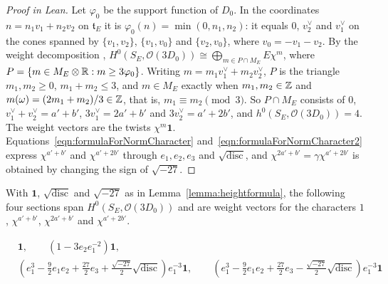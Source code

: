 \begin{proof}[Proof in Lean]

\leanok


Let $\varphi_0$ be the support function of $D_0$. In the coordinates $n=n_1v_1+n_2v_2$ on $\mathfrak t_E$ it is $\varphi_0(n)=\min(0,n_1,n_2)$: it equals $0$, $v_2^\vee$ and $v_1^\vee$ on the cones spanned by $\{v_1,v_2\}$, $\{v_1,v_0\}$ and $\{v_2,v_0\}$, where $v_0=-v_1-v_2$. By the weight decomposition \cite[\S3.4, p.~66]{MR1234037}, $H^0(S_E,\mathcal O(3D_0))\cong\bigoplus_{m\in P\cap M_E}E\chi^m$, where $P=\{m\in M_E\otimes\mathbb{R}: m\geq3\varphi_0\}$. Writing $m=m_1v_1^\vee+m_2v_2^\vee$, $P$ is the triangle $m_1,m_2\geq0$, $m_1+m_2\leq3$, and $m\in M_E$ exactly when $m_1,m_2\in\mathbb{Z}$ and $m(\omega)=(2m_1+m_2)/3\in\mathbb{Z}$, that is, $m_1\equiv m_2\pmod 3$. So $P\cap M_E$ consists of $0$, $v_1^\vee+v_2^\vee=a'+b'$, $3v_1^\vee=2a'+b'$ and $3v_2^\vee=a'+2b'$, and $h^0(S_E,\mathcal O(3D_0))=4$. The weight vectors are the twists $\chi^m\mathbf 1$. Equations~\ref{eqn:formulaForNormCharacter} and~\ref{eqn:formulaForNormCharacter2} express $\chi^{a'+b'}$ and $\chi^{a'+2b'}$ through $e_1,e_2,e_3$ and $\sqrt{\mathrm{disc}}$, and $\chi^{2a'+b'}=\gamma\chi^{a'+2b'}$ is obtained by changing the sign of $\sqrt{-27}$.

\end{proof}

\begin{equationnode}

\label{eqn:weightVectors}


\leanok

With $\mathbf 1$, $\sqrt{\mathrm{disc}}$ and $\sqrt{-27}$ as in Lemma~\ref{lemma:heightformula}, the following four sections span $H^0(S_E,\mathcal O(3D_0))$ and are weight vectors for the characters $1$, $\chi^{a'+b'}$, $\chi^{2a'+b'}$ and $\chi^{a'+2b'}$.

\begin{align*} &\mathbf 1,\qquad (1-3e_2e_1^{-2})\mathbf 1, \\ &(e_1^3-\tfrac 92 e_1 e_2+ \tfrac{27}{2} e_3 + \tfrac{\sqrt{-27}}{2} \sqrt{\mathrm{disc}}) e_1^{-3}\mathbf 1,\qquad (e_1^3-\tfrac 92 e_1 e_2+ \tfrac{27}{2} e_3 - \tfrac{\sqrt{-27}}{2} \sqrt{\mathrm{disc}}) e_1^{-3}\mathbf 1 \end{align*}

\end{equationnode}

